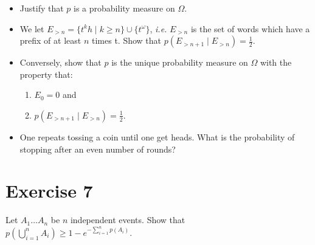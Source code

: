 \documentclass{article}
\begin{document}
\begin{itemize}
\item Justify that $p$ is a probability measure on $\Omega$.
\item We let $E_{{>}n} = \{t^k h \mid k \ge n \} \cup \{t^{\omega}\}$, \emph{i.e.} $E_{{>}n}$ is the set of words which have a prefix of at least $n$ times t. Show that $p(E_{{>}n+1} \mid E_{{>}n} ) = \frac{1}{2}$.
\item Conversely, show that $p$ is the unique probability measure on $\Omega$ with the property that:
  \begin{enumerate}
  \item $E_0 = 0$ and
  \item $p(E_{{>}n+1} \mid E_{{>}n} ) = \frac{1}{2}$. 
  \end{enumerate}
\item One repeats tossing a coin until one get heads. What is the probability of stopping after an even number of rounds?
\end{itemize}



\section*{Exercise 7}
Let $A_1 \dots A_n$ be $n$ independent events. Show that $p(\bigcup^n_{i=1} A_i) \ge 1 - e^{-\sum_{i=1}^n p(A_i)}$.


\end{document}
